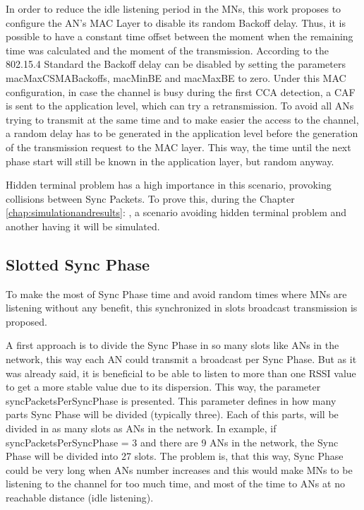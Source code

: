 In order to reduce the idle listening period in the \acp{MN}, this work proposes to configure the \ac{AN}'s \ac{MAC} Layer to disable its random 
Backoff delay. Thus, it is possible to have a constant time offset between the moment when the remaining time was calculated and the moment of the 
transmission. According to the 802.15.4 Standard the Backoff delay can be disabled by setting the parameters macMaxCSMABackoffs, macMinBE and macMaxBE 
to zero. Under this \ac{MAC} configuration, in case the channel is busy during the first \ac{CCA} detection, a \ac{CAF} is sent to the application 
level, which can try a retransmission. To avoid all \acp{AN} trying to transmit at the same time and to make easier the access to the channel, a random 
delay has to be generated in the application level before the generation of the transmission request to the \ac{MAC} layer. This way, the time until
the next phase start will still be known in the application layer, but random anyway. 

Hidden terminal problem has a high importance in this scenario, provoking collisions between Sync Packets. To prove this, during the Chapter 
\ref{chap:simulationandresults}: , a scenario avoiding hidden terminal problem and another having it will be simulated.

\subsection{Slotted Sync Phase}

To make the most of Sync Phase time and avoid random times where \acp{MN} are listening without any benefit, this synchronized in slots broadcast 
transmission is proposed.

A first approach is to divide the Sync Phase in so many slots like \acp{AN} in the network, this way each \ac{AN} could transmit a broadcast per Sync Phase.
But as it was already said, it is beneficial to be able to listen to more than one \ac{RSSI} value to get a more stable value due to its dispersion. This
way, the parameter syncPacketsPerSyncPhase is presented. This parameter defines in how many parts Sync Phase will be divided (typically three). Each of 
this parts, will be divided in as many slots as \acp{AN} in the network. In example, if syncPacketsPerSyncPhase = 3 and there are 9 \acp{AN} in the 
network, the Sync Phase will be divided into 27 slots. The problem is, that this way, Sync Phase could be very long when \acp{AN} number increases and this would make
\acp{MN} to be listening to the channel for too much time, and most of the time to \acp{AN} at no reachable distance (idle listening).

